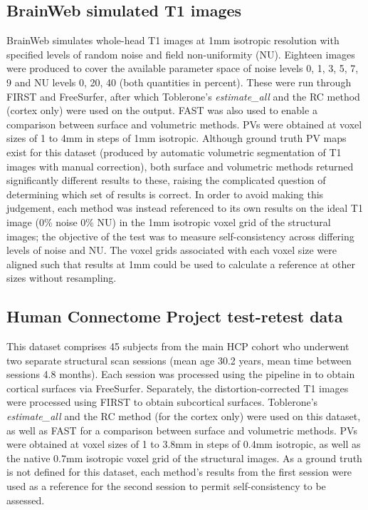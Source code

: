 \documentclass[12pt]{report}
\begin{document}
\subsection{BrainWeb simulated T1 images}
BrainWeb \cite{Collins1998, Cocosco1997} simulates whole-head T1 images at 1mm isotropic resolution with specified levels of random noise and field non-uniformity (NU).  Eighteen images were produced to cover the available parameter space of noise levels 0, 1, 3, 5, 7, 9 and NU levels 0, 20, 40 (both quantities in percent). These were run through FIRST and FreeSurfer, after which Toblerone’s \textit{estimate\_all} and the RC method (cortex only) were used on the output. FAST was also used to enable a comparison between surface and volumetric methods. PVs were obtained at voxel sizes of 1 to 4mm in steps of 1mm isotropic. Although ground truth PV maps exist for this dataset (produced by automatic volumetric segmentation of T1 images with manual correction), both surface and volumetric methods returned significantly different results to these, raising the complicated question of determining which set of results is correct. In order to avoid making this judgement, each method was instead referenced to its own results on the ideal T1 image (0\% noise 0\% NU) in the 1mm isotropic voxel grid of the structural images; the objective of the test was to measure self-consistency across differing levels of noise and NU. The voxel grids associated with each voxel size were aligned such that results at 1mm could be used to calculate a reference at other sizes without resampling. 

\subsection{Human Connectome Project test-retest data} 
This dataset comprises 45 subjects from the main HCP cohort who underwent two separate structural scan sessions (mean age 30.2 years, mean time between sessions 4.8 months). Each session was processed using the pipeline in \cite{Glasser2013} to obtain cortical surfaces via FreeSurfer. Separately, the distortion-corrected T1 images were processed using FIRST to obtain subcortical surfaces. Toblerone’s \textit{estimate\_all} and the RC method (for the cortex only) were used on this dataset, as well as FAST for a comparison between surface and volumetric methods. PVs were obtained at voxel sizes of 1 to 3.8mm in steps of 0.4mm isotropic, as well as the native 0.7mm isotropic voxel grid of the structural images. As a ground truth is not defined for this dataset, each method’s results from the first session were used as a reference for the second session to permit self-consistency to be assessed. 
\end{document}
